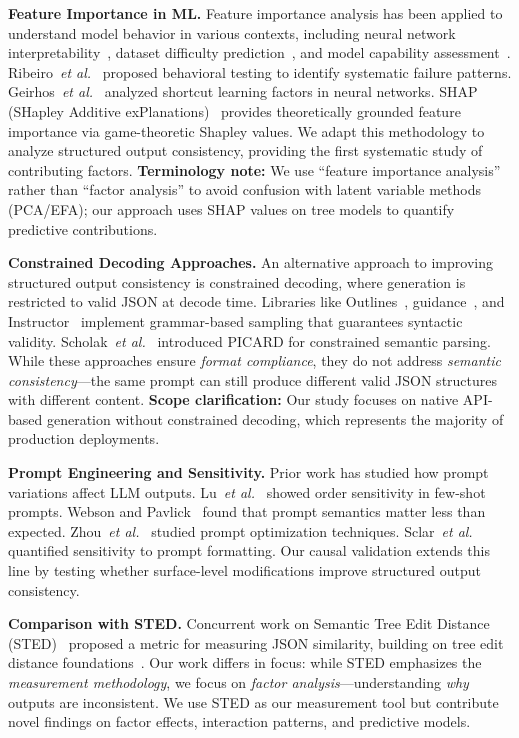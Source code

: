 \documentclass[sigconf,anonymous,review]{acmart}
\newcommand{\etal}{\textit{et al.}}
\begin{document}
\textbf{Feature Importance in ML.} Feature importance analysis has been applied to understand model behavior in various contexts, including neural network interpretability~\cite{olah2017feature}, dataset difficulty prediction~\cite{swayamdipta2020dataset}, and model capability assessment~\cite{liang2022holistic}. Ribeiro~\etal~\cite{ribeiro2020beyond} proposed behavioral testing to identify systematic failure patterns. Geirhos~\etal~\cite{geirhos2020shortcut} analyzed shortcut learning factors in neural networks. SHAP (SHapley Additive exPlanations)~\cite{lundberg2017shap} provides theoretically grounded feature importance via game-theoretic Shapley values. We adapt this methodology to analyze structured output consistency, providing the first systematic study of contributing factors. \textbf{Terminology note:} We use ``feature importance analysis'' rather than ``factor analysis'' to avoid confusion with latent variable methods (PCA/EFA); our approach uses SHAP values on tree models to quantify predictive contributions.

\textbf{Constrained Decoding Approaches.} An alternative approach to improving structured output consistency is constrained decoding, where generation is restricted to valid JSON at decode time. Libraries like Outlines~\cite{outlines2023}, guidance~\cite{guidance2023}, and Instructor~\cite{instructor2024} implement grammar-based sampling that guarantees syntactic validity. Scholak~\etal~\cite{scholak2021picard} introduced PICARD for constrained semantic parsing. While these approaches ensure \textit{format compliance}, they do not address \textit{semantic consistency}---the same prompt can still produce different valid JSON structures with different content. \textbf{Scope clarification:} Our study focuses on native API-based generation without constrained decoding, which represents the majority of production deployments.

\textbf{Prompt Engineering and Sensitivity.} Prior work has studied how prompt variations affect LLM outputs. Lu~\etal~\cite{lu2022fantastically} showed order sensitivity in few-shot prompts. Webson and Pavlick~\cite{webson2022prompt} found that prompt semantics matter less than expected. Zhou~\etal~\cite{zhou2023large} studied prompt optimization techniques. Sclar~\etal~\cite{sclar2023quantifying} quantified sensitivity to prompt formatting. Our causal validation extends this line by testing whether surface-level modifications improve structured output consistency.

\textbf{Comparison with STED.} Concurrent work on Semantic Tree Edit Distance (STED)~\cite{sted2026} proposed a metric for measuring JSON similarity, building on tree edit distance foundations~\cite{zhang1989simple,pawlik2015efficient}. Our work differs in focus: while STED emphasizes the \textit{measurement methodology}, we focus on \textit{factor analysis}---understanding \textit{why} outputs are inconsistent. We use STED as our measurement tool but contribute novel findings on factor effects, interaction patterns, and predictive models.
\end{document}
